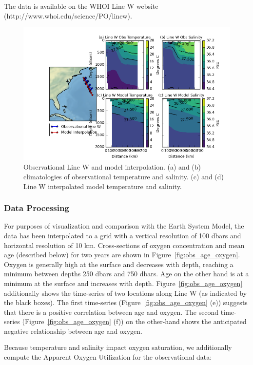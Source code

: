The data is available on the WHOI Line W website (http://www.whoi.edu/science/PO/linew).

\begin{figure}
\centering
\includegraphics[width=\linewidth]{linew_interpolation.png}
\caption{Observational Line W and model interpolation. (a) and (b) climatologies of observational temperature and salinity. (c) and (d) Line W interpolated model temperature and salinity.}
\label{fig:observational_linew_model_interpolation}
\end{figure}

\subsubsection{Data Processing}
For purposes of visualization and comparison with the Earth System Model, the
data has been interpolated to a grid with a vertical resolution of 100 dbars and
horizontal resolution of 10 km. Cross-sections of oxygen concentration and mean
age (described below) for two years are shown in Figure~\ref{fig:obs_age_oxygen}.
Oxygen is generally high at the surface and decreases with depth, reaching a
minimum between depths 250 dbars and 750 dbars. Age on the other hand is at a
minimum at the surface and increases with depth. Figure~\ref{fig:obs_age_oxygen}
additionally shows the time-series of two locations along Line W (as indicated
by the black boxes). The first time-series (Figure~\ref{fig:obs_age_oxygen} (e))
suggests that there is a positive correlation between age and oxygen. The second
time-series (Figure~\ref{fig:obs_age_oxygen} (f)) on the other-hand shows the
anticipated negative relationship between age and oxygen.

Because temperature and salinity impact oxygen saturation, we additionally
compute the Apparent Oxygen Utilization for the observational data:

